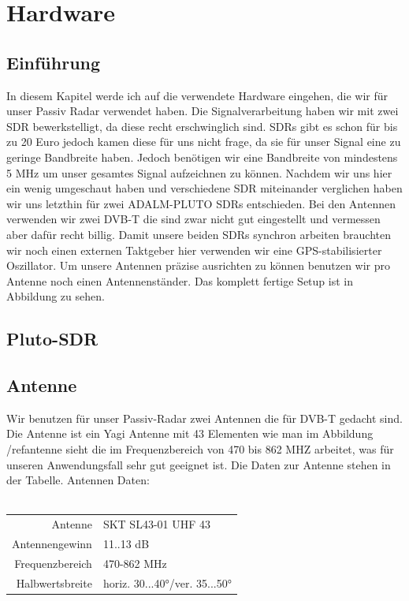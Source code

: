 \chapter{Hardware}
\section{Einführung}
In diesem Kapitel werde ich auf die verwendete Hardware eingehen, die wir für unser Passiv Radar verwendet haben. Die Signalverarbeitung haben wir mit zwei SDR bewerkstelligt, da diese recht erschwinglich sind. SDRs gibt es schon für bis zu 20 Euro jedoch kamen diese für uns nicht frage, da sie für unser Signal eine zu geringe Bandbreite haben. Jedoch benötigen wir eine Bandbreite von mindestens 5 MHz um unser gesamtes Signal aufzeichnen zu können. Nachdem wir uns hier ein wenig umgeschaut haben und verschiedene SDR miteinander verglichen haben wir uns letzthin für zwei ADALM-PLUTO SDRs entschieden. Bei den Antennen verwenden wir zwei DVB-T die sind zwar nicht gut eingestellt und vermessen aber dafür recht billig. Damit unsere beiden SDRs synchron arbeiten brauchten wir noch einen externen Taktgeber hier verwenden wir eine  GPS-stabilisierter Oszillator. Um unsere Antennen präzise ausrichten zu können benutzen wir pro Antenne noch einen Antennenständer. Das komplett fertige Setup ist in Abbildung zu sehen.
\section{Pluto-SDR}


\section{Antenne}
Wir benutzen für unser Passiv-Radar zwei Antennen die für DVB-T gedacht sind. Die Antenne ist ein Yagi Antenne mit 43 Elementen wie man im Abbildung /ref{antenne} sieht die im Frequenzbereich von 470 bis 862 MHZ arbeitet, was für unseren Anwendungsfall sehr gut geeignet ist.
Die Daten zur Antenne stehen in der Tabelle. Antennen Daten:\\ \\
\begin{tabular}[h]{rl}
    Antenne         & SKT SL43-01 UHF 43            \\
    Antennengewinn  & 11..13 dB                     \\
    Frequenzbereich & 470-862 MHz                   \\
    Halbwertsbreite & horiz. 30...40°/ver. 35...50° \\
\end{tabular}

